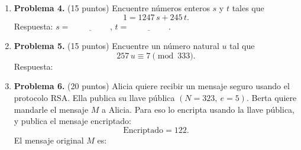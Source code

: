 \documentclass[11pt]{article}
\newcommand{\resp}{\underline{\hspace{3cm}}}
\begin{document}
\begin{enumerate}
\item[]\textbf{Problema 4.} (15 puntos) Encuentre números enteros $s$ y $t$ tales que
\[
1 = 1247\,s + 245\,t.
\]
Respuesta: $s = \underline{\hspace{2cm}}$, \quad $t = \underline{\hspace{2cm}}$.

\item[]\textbf{Problema 5.} (15 puntos) Encuentre un número natural $u$ tal que
\[
257\,u \equiv 7 \pmod{333}.
\]
Respuesta: \resp

\item[]\textbf{Problema 6.} (20 puntos) Alicia quiere recibir un mensaje seguro usando el protocolo RSA. Ella publica su llave pública $(N = 323,\ e = 5)$. Berta quiere mandarle el mensaje $M$ a Alicia. Para eso lo encripta usando la llave pública, y publica el mensaje encriptado:
\[
\text{Encriptado} = 122.
\]
El mensaje original $M$ es: \resp

\end{enumerate}

\vfill
{}
\end{document}
